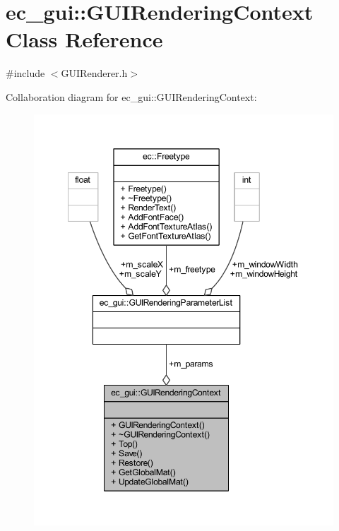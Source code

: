 \hypertarget{classec__gui_1_1_g_u_i_rendering_context}{}\section{ec\+\_\+gui\+:\+:G\+U\+I\+Rendering\+Context Class Reference}
\label{classec__gui_1_1_g_u_i_rendering_context}


{\ttfamily \#include $<$G\+U\+I\+Renderer.\+h$>$}



Collaboration diagram for ec\+\_\+gui\+:\+:G\+U\+I\+Rendering\+Context\+:\nopagebreak
\begin{figure}[H]
\begin{center}
\leavevmode
\includegraphics[width=349pt]{classec__gui_1_1_g_u_i_rendering_context__coll__graph}
\end{center}
\end{figure}
